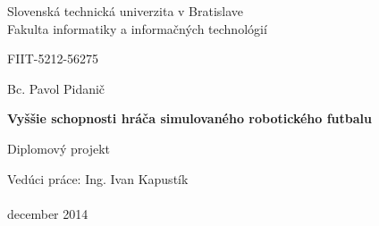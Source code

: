 \begin{titlepage}
	\begin{center}
	\large Slovenská technická univerzita v Bratislave 
	\normalsize \\
\large Fakulta informatiky a informačných technológií
	\end{center}
	\begin{center}
	  FIIT-5212-56275
	\end{center}
	\vfill
	\begin{center}
	
\begin{center}
\Large Bc. Pavol Pidanič
\end{center}
	
\begin{center}
\LARGE \textbf{Vyššie schopnosti hráča simulovaného robotického futbalu}
\end{center}
\begin{center}
\large Diplomový projekt
\end{center}
\linespread{1.3}
	\end{center}
	\vfill
	Vedúci práce: Ing. Ivan Kapustík \\\\
	december 2014
\end{titlepage}
